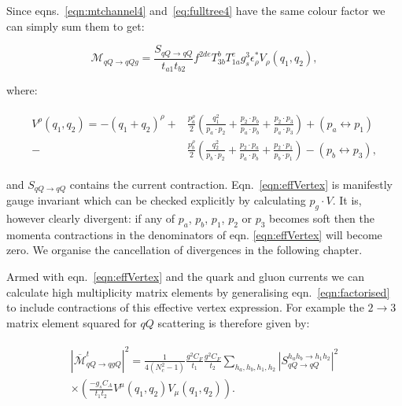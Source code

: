 	Since eqns.~\eqref{eqn:mtchannel4} and~\eqref{eq:fulltree4} have the same colour factor we can simply sum
	them to get:

	\begin{equation}
		\mathcal{M}_{qQ\rightarrow qQg} = \frac{S_{qQ\rightarrow qQ}}{t_{a1}t_{b2}}
		f^{2de}T^b_{3b}T^e_{1a}g_s^3\epsilon^*_\rho V_\rho(q_1, q_2),
	\end{equation}

	where:

	\begin{align}
	\begin{split}
		V^\rho(q_1, q_2) = -(q_1 + q_2)^\rho +
		&\frac{p_a^\rho}{2}\left(\frac{q^2_1}{p_a\cdot p_2} + \frac{p_2 \cdot p_b}{p_a \cdot p_b} +
		\frac{p_2 \cdot p_3}{p_a \cdot p_3}\right) + (p_a\leftrightarrow p_1) \\
		- &\frac{p_b^\rho}{2}\left(\frac{q^2_2}{p_b\cdot p_2} + \frac{p_2 \cdot p_a}{p_a \cdot p_b} +
		\frac{p_2 \cdot p_1}{p_b \cdot p_1}\right) - (p_b\leftrightarrow p_3),
		\label{eqn:effVertex}
	\end{split}
	\end{align}

	and $S_{qQ\rightarrow qQ}$ contains the current contraction.  Eqn.~\eqref{eqn:effVertex} is manifestly gauge invariant which can be checked explicitly by
	calculating $p_g\cdot V$.  It is, however clearly divergent:  if any of $p_a$, $p_b$, $p_1$,
	$p_2$ or $p_3$ becomes soft then the momenta contractions in the denominators of eqn.
	\eqref{eqn:effVertex} will become zero.  We organise the cancellation of divergences in
	the following chapter.

	Armed with eqn.~\eqref{eqn:effVertex} and the quark and gluon currents we can calculate
	high multiplicity matrix elements by generalising eqn.~\eqref{eqn:factorised} to include
	contractions of this effective vertex expression.  For example the $2\rightarrow3$ matrix element
	squared for $qQ$ scattering is therefore given by:

	\begin{align}
	\begin{split}
		|\overline{\mathcal{M}}^t_{qQ\rightarrow qgQ}|^2 = \frac{1}{4(N_c^2-1)}
		\frac{g^2C_F}{t_1}\frac{g^2C_F}{t_2} \sum_{h_a, h_b, h_1, h_2}
		|S_{qQ\rightarrow qQ}^{h_ah_b\rightarrow h_1h_2}|^2\\
		\times\left(\frac{-g_sC_A}{t_1t_{2}}V^\mu(q_1, q_{2})V_\mu(q_1, q_{2})\right).
		\label{eqn:factorised2To3}
	\end{split}
	\end{align}

